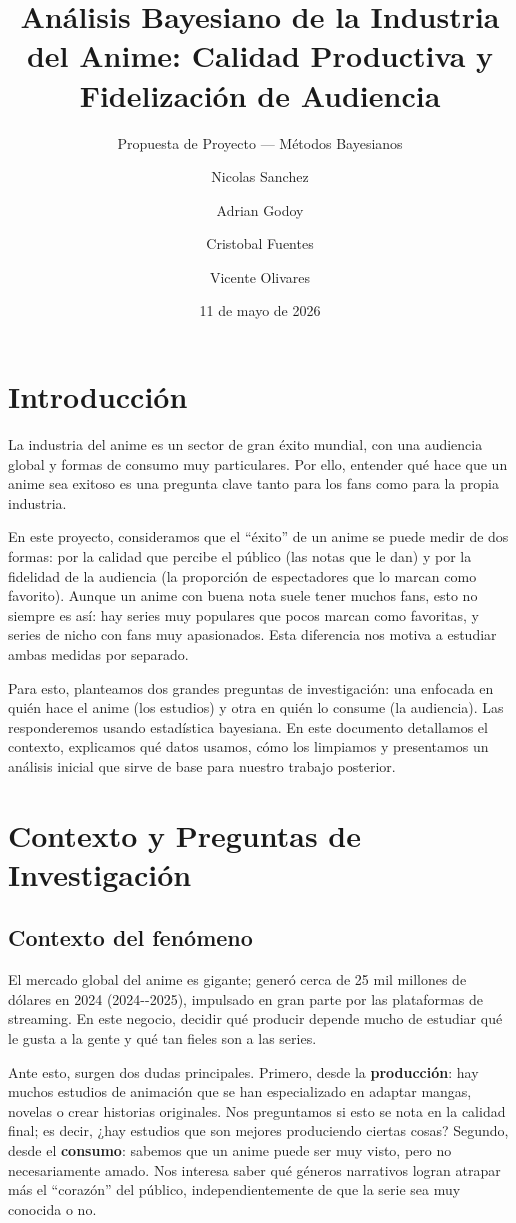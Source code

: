 \documentclass[
  spanish,
  11pt,
  letterpaper,
]{article}
\title{Análisis Bayesiano de la Industria del Anime: Calidad Productiva
y Fidelización de Audiencia}
\subtitle{Propuesta de Proyecto --- Métodos Bayesianos}
\author{Nicolas Sanchez \and Adrian Godoy \and Cristobal
Fuentes \and Vicente Olivares}
\date{11 de mayo de 2026}
\begin{document}
\maketitle


\section{Introducción}\label{introducciuxf3n}

La industria del anime es un sector de gran éxito mundial, con una
audiencia global y formas de consumo muy particulares. Por ello,
entender qué hace que un anime sea exitoso es una pregunta clave tanto
para los fans como para la propia industria.

En este proyecto, consideramos que el ``éxito'' de un anime se puede
medir de dos formas: por la calidad que percibe el público (las notas
que le dan) y por la fidelidad de la audiencia (la proporción de
espectadores que lo marcan como favorito). Aunque un anime con buena
nota suele tener muchos fans, esto no siempre es así: hay series muy
populares que pocos marcan como favoritas, y series de nicho con fans
muy apasionados. Esta diferencia nos motiva a estudiar ambas medidas por
separado.

Para esto, planteamos dos grandes preguntas de investigación: una
enfocada en quién hace el anime (los estudios) y otra en quién lo
consume (la audiencia). Las responderemos usando estadística bayesiana.
En este documento detallamos el contexto, explicamos qué datos usamos,
cómo los limpiamos y presentamos un análisis inicial que sirve de base
para nuestro trabajo posterior.

\section{Contexto y Preguntas de
Investigación}\label{contexto-y-preguntas-de-investigaciuxf3n}

\subsection{Contexto del fenómeno}\label{contexto-del-fenuxf3meno}

El mercado global del anime es gigante; generó cerca de 25 mil millones
de dólares en 2024 (2024-\/-2025), impulsado en gran parte por las
plataformas de streaming. En este negocio, decidir qué producir depende
mucho de estudiar qué le gusta a la gente y qué tan fieles son a las
series.

Ante esto, surgen dos dudas principales. Primero, desde la
\textbf{producción}: hay muchos estudios de animación que se han
especializado en adaptar mangas, novelas o crear historias originales.
Nos preguntamos si esto se nota en la calidad final; es decir, ¿hay
estudios que son mejores produciendo ciertas cosas? Segundo, desde el
\textbf{consumo}: sabemos que un anime puede ser muy visto, pero no
necesariamente amado. Nos interesa saber qué géneros narrativos logran
atrapar más el ``corazón'' del público, independientemente de que la
serie sea muy conocida o no.
\end{document}
